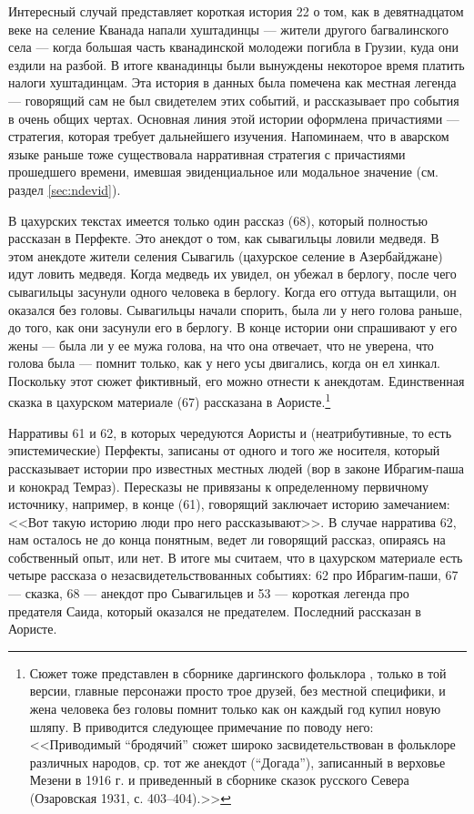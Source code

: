 Интересный случай представляет короткая история 22 о том, как в девятнадцатом веке на селение Кванада напали хуштадинцы --- жители другого багвалинского села --- когда большая часть кванадинской молодежи погибла в Грузии, куда они ездили на разбой. В итоге кванадинцы были вынуждены некоторое время платить налоги хуштадинцам. Эта история в данных была помечена как местная легенда --- говорящий сам не был свидетелем этих событий, и рассказывает про события в очень общих чертах. Основная линия этой истории оформлена причастиями --- стратегия, которая требует дальнейшего изучения. Напоминаем, что в аварском языке раньше тоже существовала нарративная стратегия с причастиями прошедшего времени, имевшая эвиденциальное или модальное значение (см. раздел \ref{sec:ndevid}).
\par В цахурских текстах имеется только один рассказ (68), который полностью рассказан в Перфекте. Это анекдот о том, как сывагильцы ловили медведя. В этом анекдоте жители селения Сывагиль (цахурское селение в Азербайджане) идут ловить медведя. Когда медведь их увидел, он убежал в берлогу, после чего сывагильцы засунули одного человека в берлогу. Когда его оттуда вытащили, он оказался без головы. Сывагильцы начали спорить, была ли у него голова раньше, до того, как они засунули его в берлогу. В конце истории они спрашивают у его жены — была ли у ее мужа голова, на что она отвечает, что не уверена, что голова была --- помнит только, как у него усы двигались, когда он ел хинкал. Поскольку этот сюжет фиктивный, его можно отнести к анекдотам. Единственная сказка в цахурском материале (67) рассказана в Аористе.\footnote{Сюжет тоже представлен в сборнике даргинского фольклора \citep[114--116]{vandenberg2001}, только в той версии, главные персонажи просто трое друзей, без местной специфики, и жена человека без головы помнит только как он каждый год купил новую шляпу. В \citep{tsakhurgram} приводится следующее примечание по поводу него: <<Приводимый ``бродячий'' сюжет широко засвидетельствован в фольклоре различных народов, ср. тот же анекдот (``Догада''), записанный в верховье Мезени в 1916 г. и приведенный в сборнике сказок русского Севера (Озаровская 1931, с. 403--404).>>}
\par Нарративы 61 и 62, в которых чередуются Аористы и (неатрибутивные, то есть эпистемические) Перфекты, записаны от одного и того же носителя, который рассказывает истории про известных местных людей (вор в законе Ибрагим-паша и конокрад Темраз). Пересказы не привязаны к определенному первичному источнику, например, в конце (61), говорящий заключает историю замечанием: <<Вот такую историю люди про него рассказывают>>. В случае нарратива 62, нам осталось не до конца понятным, ведет ли говорящий рассказ, опираясь на собственный опыт, или нет. В итоге мы считаем, что в цахурском материале есть четыре рассказа о незасвидетельствованных событиях: 62 про Ибрагим-паши, 67 --- сказка, 68 --- анекдот про Сывагильцев и 53 --- короткая легенда про предателя Саида, который оказался не предателем. Последний рассказан в Аористе.

